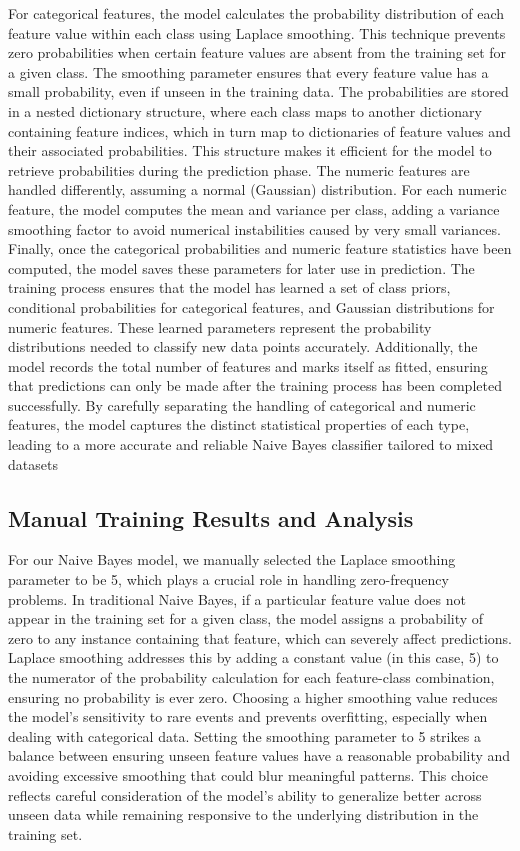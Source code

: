 For categorical features, the model calculates the probability distribution of each feature value within each class using Laplace smoothing. This technique prevents zero probabilities when certain feature values are absent from the training set for a given class. The smoothing parameter ensures that every feature value has a small probability, even if unseen in the training data. The probabilities are stored in a nested dictionary structure, where each class maps to another dictionary containing feature indices, which in turn map to dictionaries of feature values and their associated probabilities. This structure makes it efficient for the model to retrieve probabilities during the prediction phase. The numeric features are handled differently, assuming a normal (Gaussian) distribution. For each numeric feature, the model computes the mean and variance per class, adding a variance smoothing factor to avoid numerical instabilities caused by very small variances.\\

Finally, once the categorical probabilities and numeric feature statistics have been computed, the model saves these parameters for later use in prediction. The training process ensures that the model has learned a set of class priors, conditional probabilities for categorical features, and Gaussian distributions for numeric features. These learned parameters represent the probability distributions needed to classify new data points accurately. Additionally, the model records the total number of features and marks itself as fitted, ensuring that predictions can only be made after the training process has been completed successfully. By carefully separating the handling of categorical and numeric features, the model captures the distinct statistical properties of each type, leading to a more accurate and reliable Naive Bayes classifier tailored to mixed datasets

\subsection{Manual Training Results and Analysis}
For our Naive Bayes model, we manually selected the Laplace smoothing parameter to be 5, which plays a crucial role in handling zero-frequency problems. In traditional Naive Bayes, if a particular feature value does not appear in the training set for a given class, the model assigns a probability of zero to any instance containing that feature, which can severely affect predictions. Laplace smoothing addresses this by adding a constant value (in this case, 5) to the numerator of the probability calculation for each feature-class combination, ensuring no probability is ever zero. Choosing a higher smoothing value reduces the model’s sensitivity to rare events and prevents overfitting, especially when dealing with categorical data. Setting the smoothing parameter to 5 strikes a balance between ensuring unseen feature values have a reasonable probability and avoiding excessive smoothing that could blur meaningful patterns. This choice reflects careful consideration of the model’s ability to generalize better across unseen data while remaining responsive to the underlying distribution in the training set.

